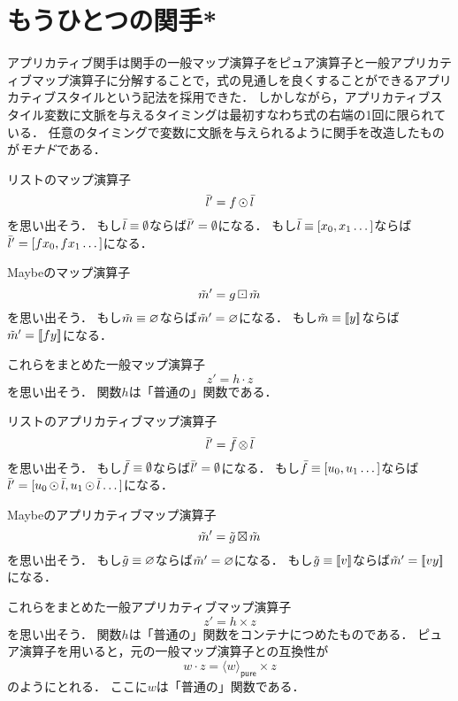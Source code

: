 \documentclass[twocolumn]{jsbook}
\def\[{[\![}
\def\]{]\!]}
\newcommand{\keyword}[1]{{\emph{#1}}}
\DeclareMathOperator{\hsklApplicativeMap}{\times}
\DeclareMathOperator{\hsklApplicativeListMap}{\otimes}
\DeclareMathOperator{\hsklApplicativeMaybeMap}{\boxtimes}
\DeclareMathOperator{\hsklFmap}{\cdot}
\DeclareMathOperator{\hsklMap}{\odot}
\DeclareMathOperator{\hsklMaybeMap}{\boxdot}
\newcommand{\hsklEmptyList}{\emptyset}
\newcommand{\hsklNothing}{\varnothing}
\newcommand{\hsklJust}[1]{\[#1\]}
\newcommand{\hsklList}[1]{\Bar{#1}}
\newcommand{\hsklMaybe}[1]{\Tilde{#1}}
\newcommand{\hsklPure}[1]{\langle#1\rangle_\textsf{pure}}
\begin{document}
\section{もうひとつの関手*}


アプリカティブ関手は関手の一般マップ演算子をピュア演算子と一般アプリカティブマップ演算子に分解することで，式の見通しを良くすることができるアプリカティブスタイルという記法を採用できた．
しかしながら，アプリカティブスタイル変数に文脈を与えるタイミングは最初すなわち式の右端の1回に限られている．
任意のタイミングで変数に文脈を与えられるように関手を改造したものが\keyword{モナド}である．

リストのマップ演算子$$\hsklList{l}'=f\hsklMap\hsklList{l}$$を思い出そう．
もし$\hsklList{l}\equiv\hsklEmptyList$ならば$\hsklList{l}'=\hsklEmptyList$になる．
もし$\hsklList{l}\equiv[x_0,x_1\dots]$ならば$\hsklList{l}'=[fx_0,fx_1\dots]$になる．

Maybeのマップ演算子$$\hsklMaybe{m}'=g\hsklMaybeMap\hsklMaybe{m}$$を思い出そう．
もし$\hsklMaybe{m}\equiv\hsklNothing$ならば$\hsklMaybe{m}'=\hsklNothing$になる．
もし$\hsklMaybe{m}\equiv\hsklJust{y}$ならば$\hsklMaybe{m}'=\hsklJust{fy}$になる．

これらをまとめた一般マップ演算子$$z'=h\hsklFmap z$$を思い出そう．
関数$h$は「普通の」関数である．

リストのアプリカティブマップ演算子$$\hsklList{l}'=\hsklList{f}\hsklApplicativeListMap\hsklList{l}$$を思い出そう．
もし$\hsklList{f}\equiv\hsklEmptyList$ならば$\hsklList{l}'=\hsklEmptyList$になる．
もし$\hsklList{f}\equiv[u_0,u_1\dots]$ならば$\hsklList{l}'=[u_0\hsklMap\hsklList{l},u_1\hsklMap\hsklList{l}\dots]$になる．

Maybeのアプリカティブマップ演算子$$\hsklMaybe{m}'=\hsklMaybe{g}\hsklApplicativeMaybeMap\hsklMaybe{m}$$を思い出そう．
もし$\hsklMaybe{g}\equiv\hsklNothing$ならば$\hsklMaybe{m}'=\hsklNothing$になる．
もし$\hsklMaybe{g}\equiv\hsklJust{v}$ならば$\hsklMaybe{m}'=\hsklJust{vy}$になる．

これらをまとめた一般アプリカティブマップ演算子$$z'=h\hsklApplicativeMap z$$を思い出そう．
関数$h$は「普通の」関数をコンテナにつめたものである．
ピュア演算子を用いると，元の一般マップ演算子との互換性が$$w\hsklFmap z=\hsklPure{w}\hsklApplicativeMap z$$のようにとれる．
ここに$w$は「普通の」関数である．
\end{document}
